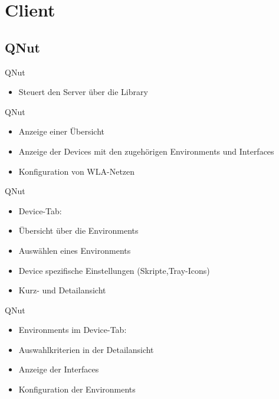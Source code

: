 
\section{Client}
\subsection{QNut}
\begin{frame}[<+-| alert@+>]{QNut}
	\begin{itemize}
		\item Steuert den Server über die Library
	\end{itemize}
\end{frame}

\begin{frame}[<+-| alert@+>]{QNut}
	\begin{itemize}
		\item Anzeige einer Übersicht
		\item Anzeige der Devices mit den zugehörigen Environments und Interfaces
		\item Konfiguration von WLA-Netzen
	\end{itemize}
\end{frame}

\begin{frame}[<+-| alert@+>]{QNut}
	\begin{itemize}
		\item Device-Tab: 
		\item Übersicht über die Environments
		\item Auswählen eines Environments
		\item Device spezifische Einstellungen (Skripte,Tray-Icons)
		\item Kurz- und Detailansicht
	\end{itemize}
\end{frame}

\begin{frame}[<+-| alert@+>]{QNut}
	\begin{itemize}
		\item Environments im Device-Tab: 
		\item Auswahlkriterien in der Detailansicht
		\item Anzeige der Interfaces
		\item Konfiguration der Environments
	\end{itemize}
\end{frame}